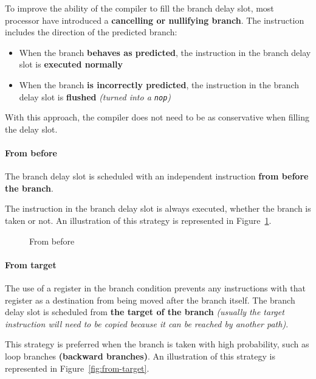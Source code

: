 \documentclass[english]{article}
\begin{document}
To improve the ability of the compiler to fill the branch delay slot, most processor have introduced a \textbf{cancelling or nullifying branch}.
The instruction includes the direction of the predicted branch:

\begin{itemize}
  \item When the branch \textbf{behaves as predicted}, the instruction in the branch delay slot is \textbf{executed normally}
  \item When the branch \textbf{is incorrectly predicted}, the instruction in the branch delay slot is \textbf{flushed} \textit{(turned into a \texttt{nop})}
\end{itemize}

With this approach, the compiler does not need to be as conservative when filling the delay slot.

\paragraph{From before}

The branch delay slot is scheduled with an independent instruction \textbf{from before the branch}.

The instruction in the branch delay slot is always executed, whether the branch is taken or not.
An illustration of this strategy is represented in Figure~\ref{fig:from-before}.

\begin{figure}[htbp]
  \bigskip
  \centering
  \caption{From before}
  \label{fig:from-before}
  \bigskip
\end{figure}

\paragraph{From target}

The use of a register in the branch condition prevents any instructions with that register as a destination from being moved after the branch itself.
The branch delay slot is scheduled from \textbf{the target of the branch} \textit{(usually the target instruction will need to be copied because it can be reached by another path)}.

This strategy is preferred when the branch is taken with high probability, such as loop branches \textbf{(backward branches)}.
An illustration of this strategy is represented in Figure~\ref{fig:from-target}.
\end{document}
